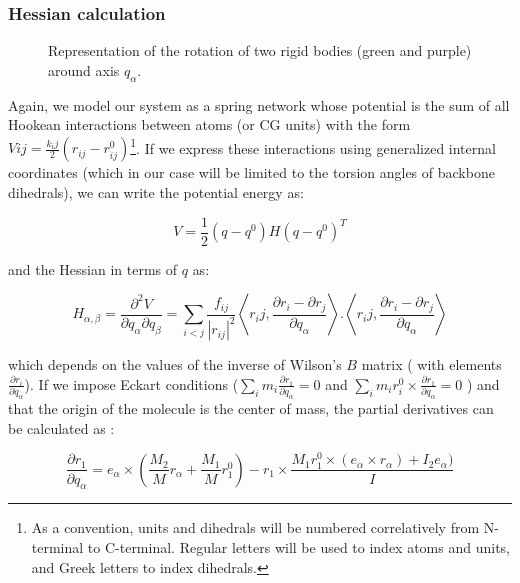 \subsubsection{Hessian calculation}

\begin{figure}
\caption{Representation of the rotation of two rigid bodies (green and purple) around axis $q_{\alpha}$.}
\label{fig:icNMA_bodies}
\end{figure}

Again, we model our system as a spring network whose potential is the sum of all Hookean interactions between atoms (or CG units) with the form $Vij = \frac{k_ij}{2} (r_{ij} - r_{ij}^0)$\footnote{As a convention, units and dihedrals will be numbered correlatively from N-terminal to C-terminal. Regular letters will be used to index atoms and units, and Greek letters to index dihedrals.}. If we express these interactions using generalized internal coordinates (which in our case will be limited to the torsion angles of backbone dihedrals), we can write the potential energy as:

\begin{equation}
V = \frac{1}{2} (q - q^0) H (q-q^0)^T
\end{equation}

and the Hessian in terms of $q$ \cite{kovacs_conformational_2005} as:

\begin{equation}
H_{\alpha,\beta} = \frac{\partial^2 V }{\partial q_\alpha \partial q_\beta} = \sum_{i<j} \frac{f_{ij}}{ \left| r_{ij} \right|^2} \left< r_ij , \frac{\partial r_i - \partial r_j}{\partial q_\alpha} \right> . \left< r_ij , \frac{\partial r_i - \partial r_j}{\partial q_\alpha} \right > 
\end{equation}

which depends on the values of the inverse of Wilson's $B$ matrix \cite{wilson_molecular_2012} ( with elements $\frac{\partial r_i}{\partial q_\alpha}$). If we impose Eckart conditions \cite{eckart_studies_1935} ($\sum_i m_i \frac{\partial r_1}{\partial q_\alpha} = 0$  and $\sum_i m_ir_i^0 \times \frac{\partial r_1}{\partial q_\alpha} = 0$ ) and that the origin of the molecule is the center of mass, the partial derivatives can be calculated as \cite{noguti_dynamics_1983}:

\begin{equation}
\frac{\partial r_1}{\partial q_\alpha} = e_\alpha \times \left( \frac{M_2}{M} r_\alpha + \frac{M_1}{M} r_1^0 \right) - r_1 \times \frac{M_1 r_1^0 \times (e_\alpha \times r_\alpha) + I_2 e_\alpha)}{I}
\end{equation}

